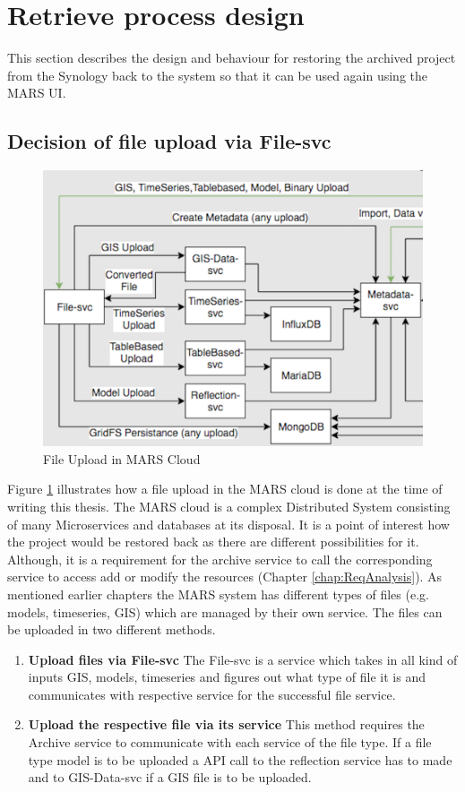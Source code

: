 \section{Retrieve process design}
This section describes the design and behaviour for restoring the archived project from the Synology back to the system
so that it can be used again using the MARS UI.   

\subsection{Decision of file upload via File-svc}

\begin{figure}[H]
    \centering \includegraphics[scale=0.6]{grafiken/mars-cloud.png}
    \caption{File Upload in MARS Cloud \cite{MARSCLoud}}
    \label{fig:MARSCloud}
\end{figure}

Figure \ref{fig:MARSCloud} illustrates how a file upload in the MARS cloud is done at the time of writing this thesis. 
The MARS cloud is a complex Distributed System consisting of many 
Microservices and databases at its disposal. It is a point of interest how the project would be restored back as there are different possibilities for it. 
Although, it is a requirement for the archive service
to call the corresponding service to access add or modify the resources (Chapter \ref{chap:ReqAnalysis}). As mentioned earlier chapters the MARS system
has different types of files (e.g. models, timeseries, GIS) which are managed by their own service. The files can be uploaded in two different methods.
\begin{enumerate}
 \item \textbf{Upload files via File-svc} The File-svc is a service which takes in all kind of inputs GIS, models, timeseries and figures out what type of
    file it is and communicates with respective service for the successful file service. 
 \item \textbf{Upload the respective file via its service} This method requires the Archive service to communicate with each service of the file type. If a file type
 model is to be uploaded a API call to the reflection service has to made and to GIS-Data-svc if a GIS file is to be uploaded.
\end{enumerate} 

